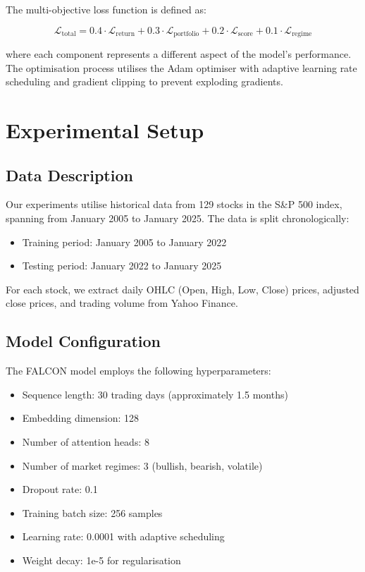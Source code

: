 \documentclass[conference]{IEEEtran}
\begin{document}
The multi-objective loss function is defined as:

\begin{equation}
\mathcal{L}_{\text{total}} = 0.4 \cdot \mathcal{L}_{\text{return}} + 0.3 \cdot \mathcal{L}_{\text{portfolio}} + 0.2 \cdot \mathcal{L}_{\text{score}} + 0.1 \cdot \mathcal{L}_{\text{regime}}
\end{equation}

where each component represents a different aspect of the model's performance. The optimisation process utilises the Adam optimiser \cite{kingma2014adam} with adaptive learning rate scheduling and gradient clipping to prevent exploding gradients.

\section{Experimental Setup}

\subsection{Data Description}
Our experiments utilise historical data from 129 stocks in the S\&P 500 index, spanning from January 2005 to January 2025. The data is split chronologically:

\begin{itemize}
\item Training period: January 2005 to January 2022
\item Testing period: January 2022 to January 2025
\end{itemize}

For each stock, we extract daily OHLC (Open, High, Low, Close) prices, adjusted close prices, and trading volume from Yahoo Finance.

\subsection{Model Configuration}
The FALCON model employs the following hyperparameters:

\begin{itemize}
\item Sequence length: 30 trading days (approximately 1.5 months)
\item Embedding dimension: 128
\item Number of attention heads: 8
\item Number of market regimes: 3 (bullish, bearish, volatile)
\item Dropout rate: 0.1
\item Training batch size: 256 samples
\item Learning rate: 0.0001 with adaptive scheduling
\item Weight decay: 1e-5 for regularisation
\end{itemize}
\end{document}
